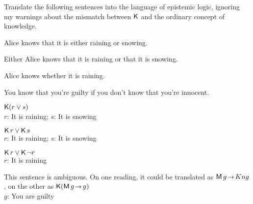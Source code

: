 
\begin{exercise}
  Translate the following sentences into the language of epistemic logic,
  ignoring my warnings about the mismatch between $\operatorname{\mathsf{K}{}}$ and the ordinary concept
  of knowledge.
  \begin{exlist}
  \item Alice knows that it is either raining or snowing.
  \item Either Alice knows that it is raining or that it is snowing.
  \item Alice knows whether it is raining.
  \item You know that you're guilty if you don't know that you're innocent.
  \end{exlist}
\end{exercise}
\begin{solution}
  \begin{sollist}
  \item $\operatorname{\mathsf{K}{}}(r \lor s)$\\
    $r$: It is raining; $s$: It is snowing\\[-2mm]
  \item $\operatorname{\mathsf{K}{}} r \lor \operatorname{\mathsf{K}{}} s$\\
    $r$: It is raining; $s$: It is snowing\\[-2mm]
  \item $\operatorname{\mathsf{K}{}} r \lor \operatorname{\mathsf{K}{}} \neg r$\\
    $r$: It is raining\\[-2mm]
  \item This sentence is ambiguous. On one reading, it could be translated as $\Mi g\to Kn g$, on the other as $\Kn(\Mi g \to g)$\\
    $g$: You are guilty
  \end{sollist}
\end{solution}

